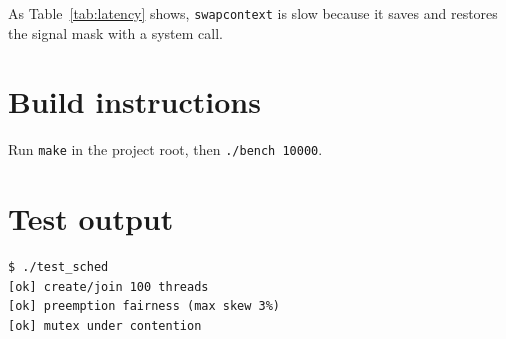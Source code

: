 \documentclass[11pt,a4paper]{article}
\begin{document}
As Table~\ref{tab:latency} shows, \texttt{swapcontext} is slow because it saves and
restores the signal mask with a system call.

\appendix
\section{Build instructions}
Run \texttt{make} in the project root, then \texttt{./bench 10000}.

\section{Test output}
\begin{lstlisting}
$ ./test_sched
[ok] create/join 100 threads
[ok] preemption fairness (max skew 3%)
[ok] mutex under contention
\end{lstlisting}
\end{document}
